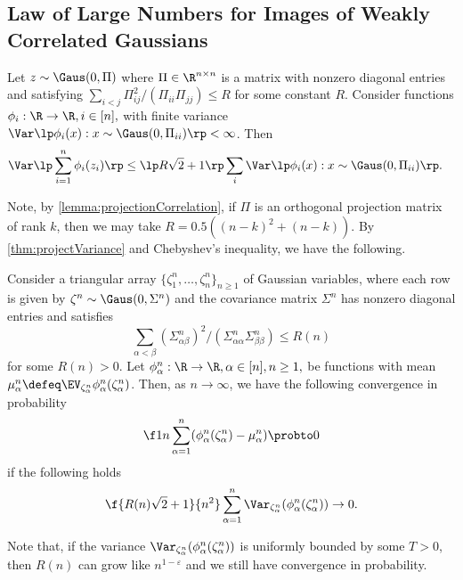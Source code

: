\documentclass[main.tex]{subfiles}
\begin{document}
\subsection{Law of Large Numbers for Images of Weakly Correlated Gaussians}

\begin{thm}\label{thm:projectVariance}
  Let $z \sim \Gaus(0, \Pi)$ where $\Pi \in \R^{n \times n}$ is a matrix with nonzero diagonal entries and
  satisfying $\sum_{i<j} \Pi_{ij}^2 / (\Pi_{ii} \Pi_{jj}) \le R$
  for some constant $R$.
  Consider functions $\phi_i: \R \to \R, i\in[n],$ with finite variance $\Var\lp \phi_i(x) : x \sim \Gaus(0, \Pi_{ii})\rp < \infty$.
  Then
  \begin{align*}
      \Var\lp\sum_{i=1}^n \phi_i(z_i)\rp
          &\le
              \lp R\sqrt 2 + 1 \rp \sum_i \Var\lp \phi_i(x) : x \sim \Gaus(0, \Pi_{ii})\rp.
  \end{align*}
\end{thm}

Note, by \cref{lemma:projectionCorrelation}, if $\Pi$ is an orthogonal projection matrix of rank $k$, then we may take $R = 0.5 ((n - k)^2 + (n-k))$.
By \cref{thm:projectVariance} and Chebyshev's inequality, we have the following.
\begin{cor}
  \label{thm:WeakLLNGaussianImage} Consider a triangular array $\{\zeta_{1}^{n},\ldots,\zeta_{n}^{n}\}_{n\ge1}$ of Gaussian variables, where each row is given by $\zeta^{n}\sim\Gaus(0,\Sigma^{n})$ and the covariance matrix $\Sigma^{n}$ has nonzero diagonal entries and satisfies
  \[\sum_{\alpha<\beta}(\Sigma_{\alpha\beta}^{n})^{2} / (\Sigma_{\alpha\alpha}^n \Sigma_{\beta\beta}^n)\le R(n)\]
  for some $R(n) > 0$.
  Let $\phi^n_\alpha:\R\to\R, \alpha\in[n], n \ge1,$ be functions with mean $\mu_\alpha^n \defeq \EV_{\zeta_\alpha^n} \phi^n_\alpha(\zeta^n_\alpha)$.
  Then, as $n\to\infty$, we have the following convergence in probability
  \begin{align*}
    \f 1 n \sum_{\alpha=1}^n (\phi^n_\alpha(\zeta^n_\alpha) - \mu^n_\alpha) \probto 0
  \end{align*}
  if the following holds
  \begin{align*}
    \f{R(n) \sqrt 2 + 1}{n^2}\sum_{\alpha=1}^n \Var_{\zeta^n_\alpha}(\phi^n_\alpha(\zeta^n_\alpha)) \to 0.
  \end{align*}
\end{cor}
Note that, if the variance $\Var_{\zeta^n_\alpha}(\phi^n_\alpha(\zeta^n_\alpha))$ is uniformly bounded by some $T>0$, then $R(n)$ can grow like $n^{1-\varepsilon}$ and we still have convergence in probability.
\end{document}
